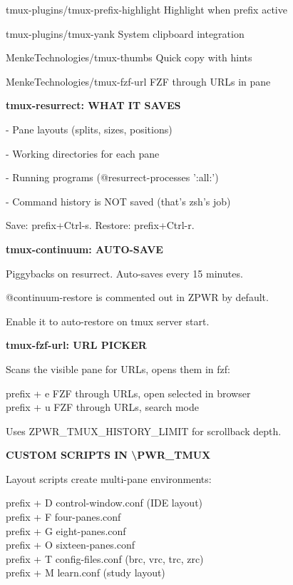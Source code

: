 \documentclass[11pt,a4paper,twoside]{book}
\begin{document}
tmux-plugins/tmux-prefix-highlight Highlight when prefix active

tmux-plugins/tmux-yank           System clipboard integration

MenkeTechnologies/tmux-thumbs     Quick copy with hints

MenkeTechnologies/tmux-fzf-url    FZF through URLs in pane


\vspace{12pt}
{\bfseries\color{neonyellow} tmux-resurrect: WHAT IT SAVES}\vspace{4pt}

- Pane layouts (splits, sizes, positions)

- Working directories for each pane

- Running programs (@resurrect-processes ':all:')

- Command history is NOT saved (that's zsh's job)

Save: prefix+Ctrl-s. Restore: prefix+Ctrl-r.


\vspace{12pt}
{\bfseries\color{neonyellow} tmux-continuum: AUTO-SAVE}\vspace{4pt}

Piggybacks on resurrect. Auto-saves every 15 minutes.

@continuum-restore is commented out in ZPWR by default.

Enable it to auto-restore on tmux server start.


\vspace{12pt}
{\bfseries\color{neonyellow} tmux-fzf-url: URL PICKER}\vspace{4pt}

Scans the visible pane for URLs, opens them in fzf:

\begin{codebox}
prefix + e   FZF through URLs, open selected in browser\\
prefix + u   FZF through URLs, search mode\\
\end{codebox}

Uses ZPWR\_TMUX\_HISTORY\_LIMIT for scrollback depth.


\vspace{12pt}
{\bfseries\color{neonyellow} CUSTOM SCRIPTS IN \textbackslash{}PWR\_TMUX}\vspace{4pt}

Layout scripts create multi-pane environments:

\begin{codebox}
prefix + D   control-window.conf (IDE layout)\\
prefix + F   four-panes.conf\\
prefix + G   eight-panes.conf\\
prefix + O   sixteen-panes.conf\\
prefix + T   config-files.conf (brc, vrc, trc, zrc)\\
prefix + M   learn.conf (study layout)\\
\end{codebox}
\end{document}
